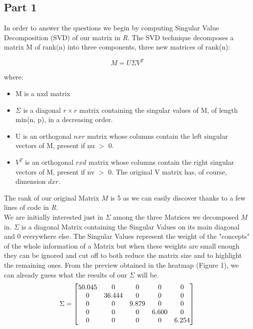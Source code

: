\documentclass[10pt]{article}
\theoremstyle{plain}
\theoremstyle{definition}
\begin{document}
\subsection{Part 1}
In order to answer the questions we begin by computing Singular Value Decomposition (SVD) of our matrix in \textit{R}. 
The SVD technique decomposes a matrix M of rank(n) into three components, three new matrices of rank(n):

\begin{equation}
    M = U\Sigma V^T
\end{equation}

where:

\begin{itemize}
    \item M is a nxd matrix 
    \item $\Sigma$ is a diagonal $r\times r$ matrix containing the singular values of M, of length min(n, p), in a decreasing order.
    \item U is an orthogonal $nxr$ matrix whose columns contain the left singular vectors of M, present if nu $>$ 0.
    \item $V^T$ is an orthogonal $rxd$ matrix whose columns contain the right singular vectors of M, present if nv $>$ 0. The original V matrix has, of course, dimension $dxr$.
\end{itemize}

The rank of our original Matrix $M$ is 5 as we can easily discover thanks to a few lines of code in \textit{R}. \\

We are initially interested just in $\Sigma$ among the three Matrices we decomposed $M$ in.
$\Sigma$ is a diagonal Matrix containing the Singular Values on its main diagonal and $0$ everywhere else. 
The Singular Values represent the weight of the "concepts" of the whole information of a Matrix but when these weights are small enough they can be ignored and cut off to both reduce the matrix size and to highlight the remaining ones.
From the preview obtained in the heatmap (Figure 1), we can already guess what the results of our $\Sigma$ will be.
\begin{equation}
\Sigma = 
\begin{bmatrix}
$50.045$ & $0$ & $0$ & $0$ & $0$ \\ 
$0$ & $36.444$ & $0$ & $0$ & $0$ \\ 
$0$ & $0$ & $9.879$ & $0$ & $0$ \\ 
$0$ & $0$ & $0$ & $6.600$ & $0$ \\ 
$0$ & $0$ & $0$ & $0$ & $6.254$ \\ 
\end{bmatrix}
\end{equation}
\end{document}
